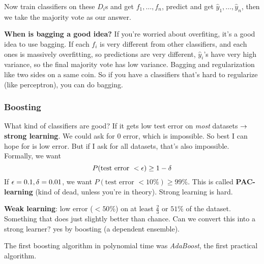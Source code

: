 Now train classifiers on these $D_i$s and get $f_1,\dots, f_n$,
predict and get $\hat y_1, \dots, \hat y_n$, then we take the majority
vote as our answer.

\textbf{When is bagging a good idea?}
If you're worried about overfiting, it's a good idea to use bagging. If each $f_i$ is
very different from other classifiers, and each ones is massively
overfitting, so predictions are very different, $\hat y_i$'s have very
high variance, so the final majority vote has low variance. Bagging and
regularization like two sides on a same coin. So if you have a
classifiers that's hard to regularize (like perceptron), you can do bagging.

\subsubsection{Boosting}
\label{sec:boosting}

What kind of classifiers are good? If it gets low test error on \emph{most} datasets
$\rightarrow$ \textbf{strong learning}.
We could ask for 0 error, which is impossible. So best I can hope for
is low error. But if I ask for all datasets, that's also
impossible. Formally, we want $$P(\text{test error }< \epsilon) \ge
1-\delta$$
If $\epsilon = 0.1, \delta = 0.01$, we want $P(\text{test error }< 10\%)
\ge 99\%$. This is called \textbf{PAC-learning} (kind of dead, unless
you're in theory). Strong learning is hard. 

\textbf{Weak learning}: low error ($< 50\%$) on at least $\frac{2}{3}$
or $51\%$
of the dataset. Something that does just slightly better than
chance. Can we convert this into a strong learner? yes by boosting (a
dependent ensemble).

The first boosting algorithm in polynomial time was \emph{AdaBoost},
the first practical algorithm.

